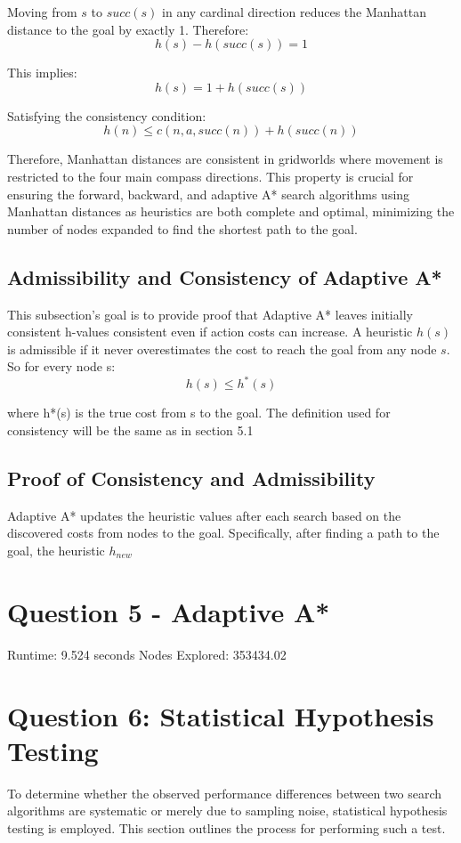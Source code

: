 \documentclass{article}
\begin{document}
Moving from \(s\) to \(succ(s)\) in any cardinal direction reduces the Manhattan distance to the goal by exactly 1. Therefore:
\[h(s) - h(succ(s)) = 1\]

This implies:
\[h(s) = 1 + h(succ(s))\]

Satisfying the consistency condition:
\[h(n) \leq c(n, a, succ(n)) + h(succ(n))\]

Therefore, Manhattan distances are consistent in gridworlds where movement is restricted to the four main compass directions. This property is crucial for ensuring the forward, backward, and adaptive A* search algorithms using Manhattan distances as heuristics are both complete and optimal, minimizing the number of nodes expanded to find the shortest path to the goal.

\subsection{Admissibility and Consistency of Adaptive A*}
This subsection's goal is to provide proof that  Adaptive A* leaves initially consistent h-values consistent even if action costs can increase.  A heuristic \(h(s)\) is admissible if it never overestimates the cost to reach the goal from any node \(s\). So for every node s: \[h(s) \leq h^*(s)\]

where h*(s) is the true cost from s to the goal. The definition used for consistency will be the same as in section 5.1

\subsection{Proof of Consistency and Admissibility}
Adaptive A* updates the heuristic values after each search based on the discovered costs from nodes to the goal. Specifically, after finding a path to the goal, the heuristic $h_{new}$





\section{Question 5 - Adaptive A*}
Runtime: 9.524 seconds
Nodes Explored: 353434.02

\section{Question 6: Statistical Hypothesis Testing}

To determine whether the observed performance differences between two search algorithms are systematic or merely due to sampling noise, statistical hypothesis testing is employed. This section outlines the process for performing such a test.
\end{document}
